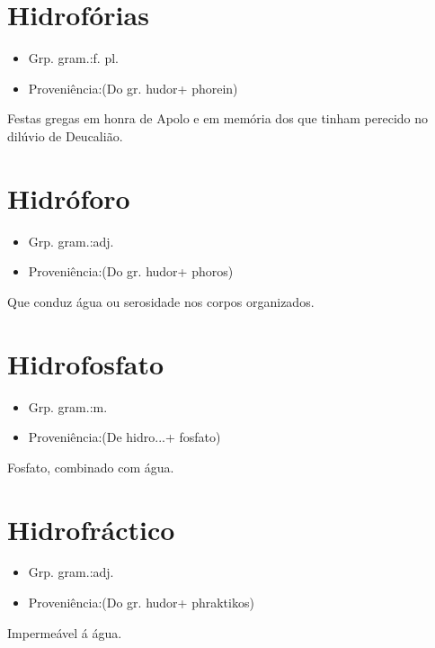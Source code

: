 \documentclass{article}
\begin{document}
\section{Hidrofórias}
\begin{itemize}
\item {Grp. gram.:f. pl.}
\end{itemize}
\begin{itemize}
\item {Proveniência:(Do gr. \textunderscore hudor\textunderscore  + \textunderscore phorein\textunderscore )}
\end{itemize}
Festas gregas em honra de Apolo e em memória dos que tinham perecido no dilúvio de Deucalião.
\section{Hidróforo}
\begin{itemize}
\item {Grp. gram.:adj.}
\end{itemize}
\begin{itemize}
\item {Proveniência:(Do gr. \textunderscore hudor\textunderscore  + \textunderscore phoros\textunderscore )}
\end{itemize}
Que conduz água ou serosidade nos corpos organizados.
\section{Hidrofosfato}
\begin{itemize}
\item {Grp. gram.:m.}
\end{itemize}
\begin{itemize}
\item {Proveniência:(De \textunderscore hidro...\textunderscore  + \textunderscore fosfato\textunderscore )}
\end{itemize}
Fosfato, combinado com água.
\section{Hidrofráctico}
\begin{itemize}
\item {Grp. gram.:adj.}
\end{itemize}
\begin{itemize}
\item {Proveniência:(Do gr. \textunderscore hudor\textunderscore  + \textunderscore phraktikos\textunderscore )}
\end{itemize}
Impermeável á água.
\end{document}
